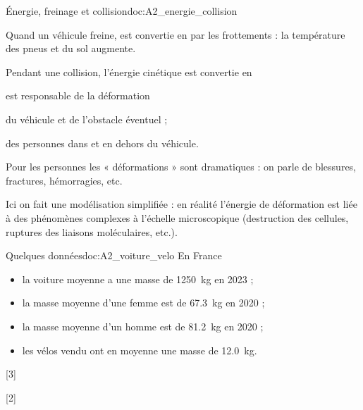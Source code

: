 \begin{doc}{Énergie, freinage et collision}{doc:A2_energie_collision}
  \begin{importants}
    Quand un véhicule freine,  est convertie en  par les frottements : la température des pneus et du sol augmente.
  
    Pendant une collision, l'énergie cinétique est convertie en 
  \end{importants}
  \begin{center}
  \end{center}
  
   est responsable de la déformation
  \begin{listePoints}
    \item du véhicule et de l'obstacle éventuel ;
    \item des personnes dans et en dehors du véhicule.
  \end{listePoints}
  Pour les personnes les « déformations » sont dramatiques : on parle de blessures, fractures, hémorragies, etc.

  \attention Ici on fait une modélisation simplifiée : en réalité l'énergie de déformation est liée à des phénomènes complexes à l'échelle microscopique (destruction des cellules, ruptures des liaisons moléculaires, etc.).
\end{doc}

\begin{doc}{Quelques données}{doc:A2_voiture_velo}
  En France 
  \begin{itemize}
      \item la voiture moyenne a une masse de \qty{1 250}{\kg} en 2023 ;
      \item la masse moyenne d'une femme est de \qty{67,3}{\kg} en 2020 ;
      \item la masse moyenne d'un homme est de \qty{81,2}{\kg} en 2020 ;
      \item les vélos vendu ont en moyenne une masse de \qty{12,0}{\kg}.
  \end{itemize}
\end{doc}

[3]

[2]

